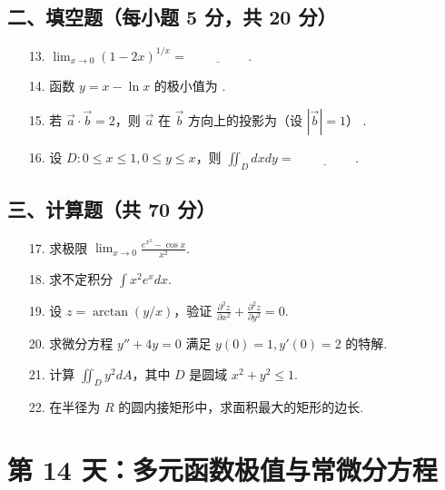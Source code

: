 \documentclass[11pt,a4paper]{article}
\begin{document}
\subsection*{二、填空题（每小题 5 分，共 20 分）}
\begin{enumerate}
    \item[13.] $\lim_{x \to 0} (1-2x)^{1/x} = \underline{\hspace{2cm}}$.
    \item[14.] 函数 $y = x - \ln x$ 的极小值为 \underline{\hspace{2cm}}.
    \item[15.] 若 $\vec{a} \cdot \vec{b} = 2$，则 $\vec{a}$ 在 $\vec{b}$ 方向上的投影为（设 $|\vec{b}|=1$） \underline{\hspace{2cm}}.
    \item[16.] 设 $D: 0 \le x \le 1, 0 \le y \le x$，则 $\iint_D dx dy = \underline{\hspace{2cm}}. $
\end{enumerate}
\subsection*{三、计算题（共 70 分）}
\begin{enumerate}
    \item[17.] 求极限 $\lim_{x \to 0} \frac{e^{x^2} - \cos x}{x^2}$.
    \item[18.] 求不定积分 $\int x^2 e^x dx$.
    \item[19.] 设 $z = \arctan(y/x)$，验证 $\frac{\partial^2 z}{\partial x^2} + \frac{\partial^2 z}{\partial y^2} = 0$.
    \item[20.] 求微分方程 $y'' + 4y = 0$ 满足 $y(0)=1, y'(0)=2$ 的特解.
    \item[21.] 计算 $\iint_D y^2 dA$，其中 $D$ 是圆域 $x^2+y^2 \le 1$.
    \item[22.] 在半径为 $R$ 的圆内接矩形中，求面积最大的矩形的边长.
\end{enumerate}

\newpage

\section*{第 14 天：多元函数极值与常微分方程}
\end{document}
